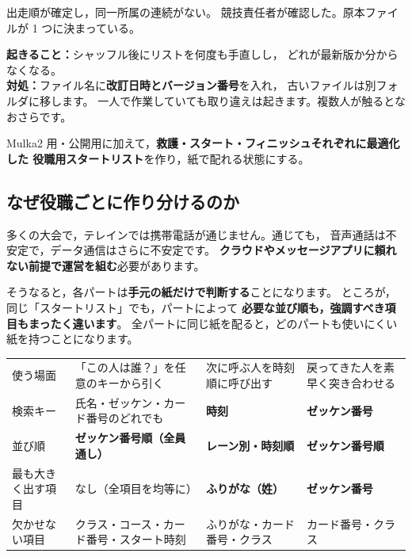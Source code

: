 \begin{Done}
出走順が確定し，同一所属の連続がない。
競技責任者が確認した。原本ファイルが 1 つに決まっている。
\end{Done}

\begin{Fail}
\textbf{起きること：}シャッフル後にリストを何度も手直しし，
どれが最新版か分からなくなる。\\
\textbf{対処：}ファイル名に\textbf{改訂日時とバージョン番号}を入れ，
古いファイルは別フォルダに移します。
一人で作業していても取り違えは起きます。複数人が触るとなおさらです。
\end{Fail}


\begin{Goal}
Mulka2 用・公開用に加えて，\textbf{救護・スタート・フィニッシュそれぞれに最適化した
役職用スタートリスト}を作り，紙で配れる状態にする。
\end{Goal}

\subsection*{なぜ役職ごとに作り分けるのか}

多くの大会で，テレインでは携帯電話が通じません。通じても，
音声通話は不安定で，データ通信はさらに不安定です。
\textbf{クラウドやメッセージアプリに頼れない前提で運営を組む}必要があります。

そうなると，各パートは\textbf{手元の紙だけで判断する}ことになります。
ところが，同じ「スタートリスト」でも，パートによって
\textbf{必要な並び順も，強調すべき項目もまったく違います}。
全パートに同じ紙を配ると，どのパートも使いにくい紙を持つことになります。

\begin{center}
\small
\begin{tabular}{@{}P{18mm}P{40mm}P{40mm}P{42mm}@{}}
\toprule
 &  &  &  \\
\midrule
使う場面 & 「この人は誰？」を任意のキーから引く & 次に呼ぶ人を時刻順に呼び出す & 戻ってきた人を素早く突き合わせる \\
検索キー & 氏名・ゼッケン・カード番号のどれでも & \textbf{時刻} & \textbf{ゼッケン番号} \\
並び順 & \textbf{ゼッケン番号順（全員通し）} & \textbf{レーン別・時刻順} & \textbf{ゼッケン番号順} \\
最も大きく出す項目 & なし（全項目を均等に） & \textbf{ふりがな（姓）} & \textbf{ゼッケン番号} \\
欠かせない項目 & クラス・コース・カード番号・スタート時刻 & ふりがな・カード番号・クラス & カード番号・クラス \\
\bottomrule
\end{tabular}
\end{center}

